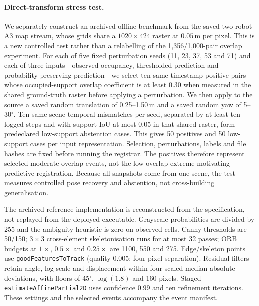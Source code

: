 \documentclass[11pt]{article}
\begin{document}
\paragraph{Direct-transform stress test.}\label{app:transform-correctness}
We separately construct an archived offline benchmark from the saved two-robot A3 map stream, whose grids share a $1020{\times}424$ raster at $0.05$\,m per pixel. This is a new controlled test rather than a relabelling of the 1{,}356/1{,}000-pair overlap experiment. For each of five fixed perturbation seeds (11, 23, 37, 53 and 71) and each of three inputs---observed occupancy, thresholded prediction and probability-preserving prediction---we select ten same-timestamp positive pairs whose occupied-support overlap coefficient is at least 0.30 when measured in the shared ground-truth raster before applying a perturbation. We then apply to the source a saved random translation of 0.25--1.50\,m and a saved random yaw of 5--30$^{\circ}$. Ten same-scene temporal mismatches per seed, separated by at least ten logged steps and with support IoU at most 0.05 in that shared raster, form predeclared low-support abstention cases. This gives 50 positives and 50 low-support cases per input representation. Selection, perturbations, labels and file hashes are fixed before running the registrar. The positives therefore represent selected moderate-overlap events, not the low-overlap extreme motivating predictive registration. Because all snapshots come from one scene, the test measures controlled pose recovery and abstention, not cross-building generalisation.

The archived reference implementation is reconstructed from the specification, not replayed from the deployed executable. Grayscale probabilities are divided by 255 and the ambiguity heuristic is zero on observed cells. Canny thresholds are 50/150; $3{\times}3$ cross-element skeletonisation runs for at most 32 passes; ORB budgets at $1{\times}$, $0.5{\times}$ and $0.25{\times}$ are 1100, 550 and 275. Edge/skeleton points use \texttt{goodFeaturesToTrack} (quality 0.005; four-pixel separation). Residual filters retain angle, log-scale and displacement within four scaled median absolute deviations, with floors of 45$^{\circ}$, $\log(1.8)$ and 160 pixels. Staged \texttt{estimateAffinePartial2D} uses confidence 0.99 and ten refinement iterations. These settings and the selected events accompany the event manifest.
\end{document}
